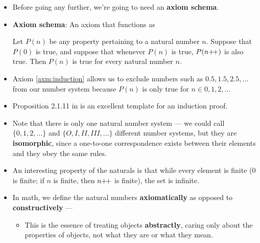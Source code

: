 \documentclass[../main.tex]{subfiles}
\begin{document}
\begin{itemize}
    \begin{prp}
        6 is not equal to 2.
        \begin{proof}
            Suppose $6=2$. Then $5\pplus=1\pplus$, so by Axiom \ref{axm:successorDistinctness}, $5=1$. Then $4\pplus=0\pplus$, so by Axiom \ref{axm:successorDistinctness}, $4=0$, which contradicts our proof that $4\neq 0$.
        \end{proof}
    \end{prp}
    \item {}Before going any further, we're going to need an \textbf{axiom schema}.
    \item \textbf{Axiom schema}: An axiom that functions as 
    \begin{axm}\label{axm:induction}
        Let $P(n)$ be any property pertaining to a natural number $n$. Suppose that $P(0)$ is true, and suppose that whenever $P(n)$ is true, $P(n{+\!+})$ is also true. Then $P(n)$ is true for every natural number $n$.
    \end{axm}
    \item Axiom \ref{axm:induction} allows us to exclude numbers such as $0.5,1.5,2.5,\dots$ from our number system because $P(n)$ is only true for $n\in 0,1,2,\dots$
    \item Proposition 2.1.11 in \cite{bib:AnalysisI} is an excellent template for an induction proof.
    \item Note that there is only one natural number system --- we could call $\{0,1,2,\dots\}$ and $\{O,I,II,III,\dots\}$ different number systems, but they are \textbf{isomorphic}, since a one-to-one correspondence exists between their elements and they obey the same rules.
    \item An interesting property of the naturals is that while every element is finite (0 is finite; if $n$ is finite, then $n{+\!+}$ is finite), the set is infinite.
    \item In math, we define the natural numbers \textbf{axiomatically} as opposed to \textbf{constructively} --- 
    \begin{itemize}
        \item This is the essence of treating objects \textbf{abstractly}, caring only about the properties of objects, not what they are or what they mean.

\end{itemize}
\end{itemize}
\end{document}

